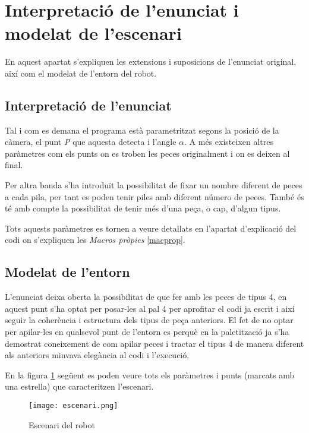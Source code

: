 \section{Interpretació de l'enunciat i modelat de l'escenari}
En aquest apartat s'expliquen les extensions i suposicions de l'enunciat original,
així com el modelat de l'entorn del robot.

\subsection{Interpretació de l'enunciat}
Tal i com es demana el programa està parametritzat segons la posició de la càmera,
el punt \emph{P} que aquesta detecta i l'angle $\alpha$. A més existeixen altres paràmetres
com els punts on es troben les peces originalment i on es deixen al final.

Per altra banda s'ha introduït la possibilitat de fixar un nombre diferent de peces
a cada pila, per tant es poden tenir piles amb diferent número de peces. També
és té amb compte la possibilitat de tenir més d'una peça, o cap, d'algun tipus.

Tots aquests paràmetres es tornen a veure detallats en l'apartat d'explicació del
codi on s'expliquen les \emph{Macros pròpies} \ref{macprop}.

\subsection{Modelat de l'entorn}

L'enunciat deixa oberta la possibilitat de que fer amb les peces de
tipus 4, en aquest punt s'ha optat per posar-les al pal 4 per aprofitar el codi ja escrit i
així seguir la coherència i estructura dels tipus de peça anteriors. El fet de
no optar per apilar-les en qualsevol punt de l'entorn es perquè en la paletització
ja s'ha demostrat coneixement de com apilar peces i tractar el tipus 4 de manera
diferent als anteriors minvava elegància al codi i l'execució.

En la figura \ref{figescenari} següent es poden veure tots els paràmetres i punts
(marcats amb una estrella) que caracteritzen l'escenari.

\begin{figure}[H]
\begin{center}\label{figescenari}
 \texttt{[image: escenari.png]}
\end{center}
  \caption{Escenari del robot}
\end{figure}

